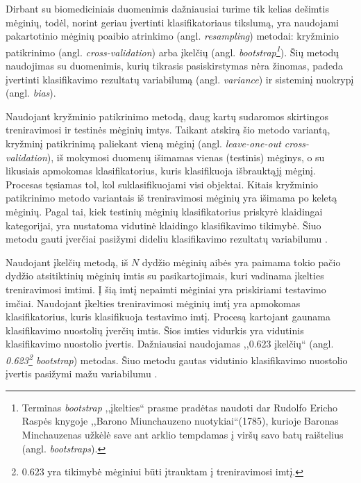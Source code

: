 Dirbant su biomediciniais duomenimis dažniausiai turime tik kelias dešimtis mėginių, todėl, norint geriau įvertinti klasifikatoriaus tikslumą, yra naudojami pakartotinio mėginių poaibio atrinkimo (angl. \textit{resampling}) metodai: kryžminio patikrinimo (angl. \textit{cross-validation}) arba įkelčių (angl. \textit{bootstrap\footnote{Terminas \textit{bootstrap} ,,įkelties`` prasme pradėtas naudoti dar Rudolfo Ericho Raspės knygoje ,,Barono Miunchauzeno nuotykiai``(1785), kurioje Baronas Minchauzenas užkėlė save ant arklio tempdamas į viršų savo batų raištelius (angl. \textit{bootstraps}).}}). Šių metodų naudojimas su duomenimis, kurių tikrasis pasiskirstymas nėra žinomas, padeda įvertinti klasifikavimo rezultatų variabilumą (angl. \textit{variance}) ir sisteminį nuokrypį (angl. \textit{bias}).

Naudojant kryžminio patikrinimo metodą, daug kartų sudaromos skirtingos treniravimosi ir testinės mėginių imtys. Taikant atskirą šio metodo variantą, kryžminį patikrinimą paliekant vieną mėginį (angl. \textit{leave-one-out cross-validation}), iš mokymosi duomenų išimamas vienas (testinis) mėginys, o su likusiais apmokomas klasifikatorius, kuris klasifikuoja išbrauktąjį mėginį. Procesas tęsiamas tol, kol suklasifikuojami visi objektai. Kitais kryžminio patikrinimo metodo variantais iš treniravimosi mėginių yra išimama po keletą mėginių. Pagal tai, kiek testinių mėginių klasifikatorius priskyrė klaidingai kategorijai, yra nustatoma vidutinė klaidingo klasifikavimo tikimybė. Šiuo metodu gauti įverčiai pasižymi dideliu klasifikavimo rezultatų variabilumu \cite{braga2004cross}.

Naudojant įkelčių metodą, iš $N$ dydžio mėginių aibės yra paimama tokio pačio dydžio atsitiktinių mėginių imtis su pasikartojimais, kuri vadinama įkelties treniravimosi imtimi. Į šią imtį nepaimti mėginiai yra priskiriami testavimo imčiai. Naudojant įkelties treniravimosi mėginių imtį yra apmokomas klasifikatorius, kuris klasifikuoja testavimo imtį. Procesą kartojant gaunama klasifikavimo nuostolių įverčių imtis. Šios imties vidurkis yra vidutinis klasifikavimo nuostolio įvertis. Dažniausiai naudojamas ,,0.623 įkelčių`` (angl. \textit{0.623\footnote{0.623 yra tikimybė mėginiui būti įtrauktam į treniravimosi imtį.} bootstrap}) metodas. Šiuo metodu gautas vidutinio klasifikavimo nuostolio įvertis pasižymi mažu variabilumu \cite{michie1994machine}.


